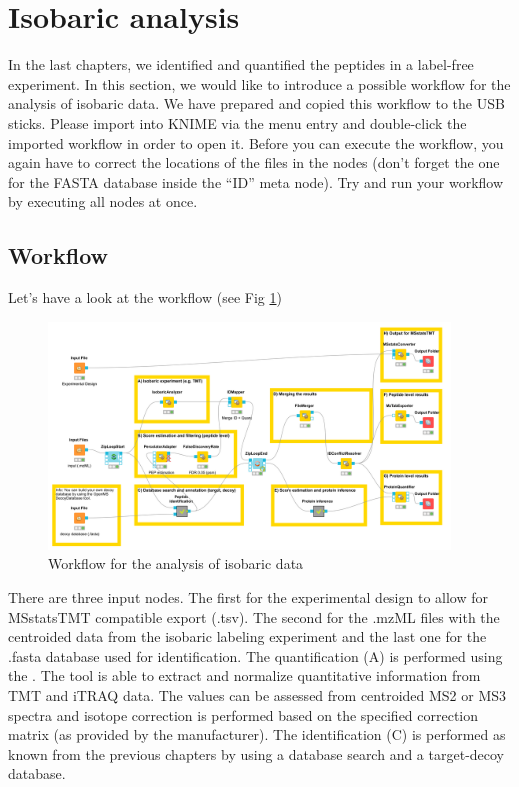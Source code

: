 
\newpage
\section{Isobaric analysis}
In the last chapters, we identified and quantified the peptides in a label-free experiment. In this section, we would like to introduce a possible workflow for the analysis of isobaric data. We have prepared and copied this workflow to the USB sticks. Please import  into KNIME via the menu entry  and double-click the imported workflow in order to open it. Before you can execute the workflow, you again have to correct the locations of the files in the  nodes (don't forget the one for the FASTA database inside the ``ID'' meta node). Try and run your workflow by 
executing all nodes at once.

\subsection{Workflow}
Let's have a look at the workflow (see Fig \ref{fig:isobaric_wf})

\begin{figure}[htbp]
  \centering
  \includegraphics[width=0.95\textwidth]{graphics/isobaric/id_qu_pi_isobaric.png}
  \caption{Workflow for the analysis of isobaric data}
  \label{fig:isobaric_wf}
\end{figure}

There are three input nodes. The first for the experimental design to allow for MSstatsTMT compatible export (.tsv). The second for the .mzML files with the centroided data from the isobaric labeling experiment and the last one for the .fasta database used for identification. The quantification (A) is performed using the . The tool is able to extract and normalize quantitative information from TMT and iTRAQ data. The values can be assessed from centroided MS2 or MS3 spectra and isotope correction is performed based on the specified correction matrix (as provided by the manufacturer). The identification (C) is performed as known from the previous chapters by using a database search and a target-decoy database. 

